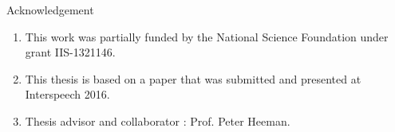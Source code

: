 \begin{frame} {Acknowledgement}
 \begin{center}
       \begin{enumerate}[<+->]\itemsep9pt
           \item This work was partially funded by the National Science Foundation under grant IIS-1321146.
           \item This thesis is based on a paper that was submitted and presented at Interspeech 2016.
           \item Thesis advisor and collaborator : Prof. Peter Heeman. 
       \end{enumerate}
 \end{center}
\end{frame}
